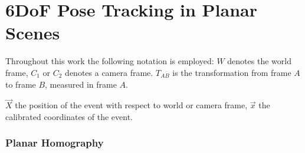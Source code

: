 \chapter{6DoF Pose Tracking in Planar Scenes}
\label{chap:planar_scenes}

Throughout this work the following notation is employed: $W$ denotes
the world frame, $C_1$ or $C_2$ denotes a camera frame.  $T_{AB}$ is
the transformation from frame $A$ to frame $B$, measured in frame $A$.

$\vec{X}$ the position of the event with respect to world or camera
frame, $\vec{x}$ the calibrated coordinates of the event.


\subsection{Planar Homography}

